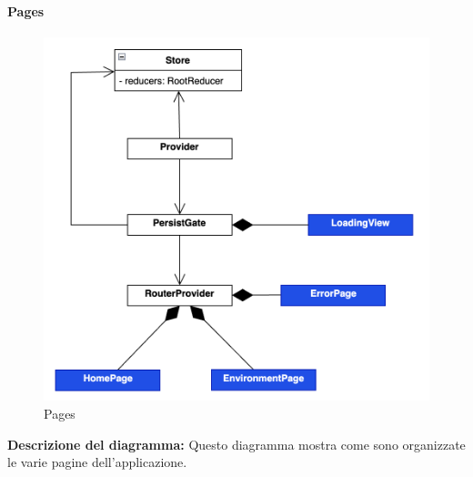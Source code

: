 \pagebreak

\paragraph{Pages}
\begin{figure}[h!] \centering
      \includegraphics[scale=0.6]{template/images/uml_front/ui/pages.png}
      \caption{Pages}
\end{figure}
\textbf{Descrizione del diagramma:}
Questo diagramma mostra come sono organizzate le varie pagine dell'applicazione.
